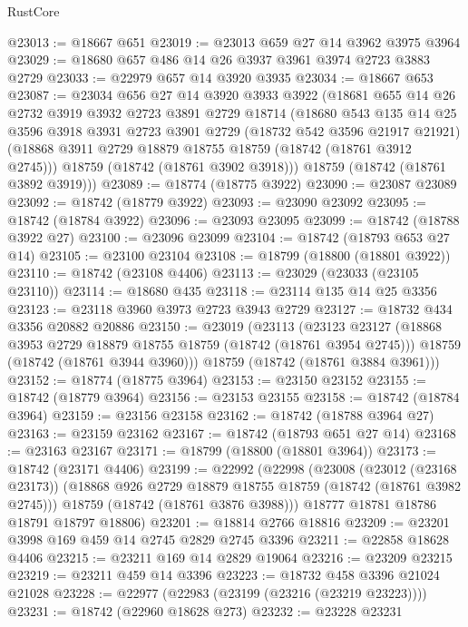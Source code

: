 \begin{lexlean}{RustCore}
\begin{coremodule}
@23013 := @18667 @651
@23019 := @23013 @659 @27 @14 @3962 @3975 @3964
@23029 := @18680 @657 @486 @14 @26 @3937 @3961 @3974 @2723 @3883 @2729
@23033 := @22979 @657 @14 @3920 @3935
@23034 := @18667 @653
@23087 := @23034
    @656
    @27
    @14
    @3920
    @3933
    @3922
    (@18681
      @655
      @14
      @26
      @2732
      @3919
      @3932
      @2723
      @3891
      @2729
      @18714
      (@18680
        @543
        @135
        @14
        @25
        @3596
        @3918
        @3931
        @2723
        @3901
        @2729
        (@18732 @542 @3596 @21917 @21921)
        (@18868 @3911 @2729 @18879 @18755 @18759 (@18742 (@18761 @3912 @2745)))
        @18759
        (@18742 (@18761 @3902 @3918)))
      @18759
      (@18742 (@18761 @3892 @3919)))
@23089 := @18774 (@18775 @3922)
@23090 := @23087 @23089
@23092 := @18742 (@18779 @3922)
@23093 := @23090 @23092
@23095 := @18742 (@18784 @3922)
@23096 := @23093 @23095
@23099 := @18742 (@18788 @3922 @27)
@23100 := @23096 @23099
@23104 := @18742 (@18793 @653 @27 @14)
@23105 := @23100 @23104
@23108 := @18799 (@18800 (@18801 @3922))
@23110 := @18742 (@23108 @4406)
@23113 := @23029 (@23033 (@23105 @23110))
@23114 := @18680 @435
@23118 := @23114 @135 @14 @25 @3356
@23123 := @23118 @3960 @3973 @2723 @3943 @2729
@23127 := @18732 @434 @3356 @20882 @20886
@23150 := @23019
    (@23113
      (@23123
        @23127
        (@18868 @3953 @2729 @18879 @18755 @18759 (@18742 (@18761 @3954 @2745)))
        @18759
        (@18742 (@18761 @3944 @3960)))
      @18759
      (@18742 (@18761 @3884 @3961)))
@23152 := @18774 (@18775 @3964)
@23153 := @23150 @23152
@23155 := @18742 (@18779 @3964)
@23156 := @23153 @23155
@23158 := @18742 (@18784 @3964)
@23159 := @23156 @23158
@23162 := @18742 (@18788 @3964 @27)
@23163 := @23159 @23162
@23167 := @18742 (@18793 @651 @27 @14)
@23168 := @23163 @23167
@23171 := @18799 (@18800 (@18801 @3964))
@23173 := @18742 (@23171 @4406)
@23199 := @22992
    (@22998
      (@23008
        (@23012 (@23168 @23173))
        (@18868 @926 @2729 @18879 @18755 @18759 (@18742 (@18761 @3982 @2745)))
        @18759
        (@18742 (@18761 @3876 @3988)))
      @18777
      @18781
      @18786
      @18791
      @18797
      @18806)
@23201 := @18814 @2766 @18816
@23209 := @23201 @3998 @169 @459 @14 @2745 @2829 @2745 @3396
@23211 := @22858 @18628 @4406
@23215 := @23211 @169 @14 @2829 @19064
@23216 := @23209 @23215
@23219 := @23211 @459 @14 @3396
@23223 := @18732 @458 @3396 @21024 @21028
@23228 := @22977 (@22983 (@23199 (@23216 (@23219 @23223))))
@23231 := @18742 (@22960 @18628 @273)
@23232 := @23228 @23231

\end{coremodule}
\end{lexlean}
